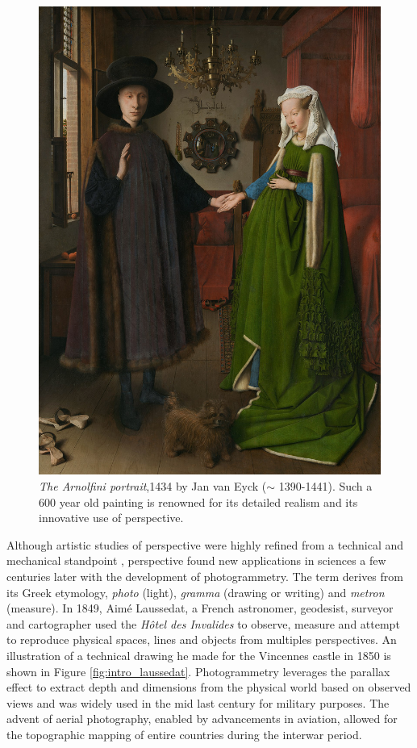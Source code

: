 \begin{figure}[htp!]
      \begin{center}
      \includegraphics[width=\textwidth]{images/introduction/The_Arnolfini_portrait.jpg}
      \end{center}
      \caption{\textit{The Arnolfini portrait},1434 by Jan van Eyck ($\sim$ 1390-1441). Such a 600 year old painting is renowned for its detailed realism and its innovative use of perspective.}
      \label{fig:arnolfini}
\end{figure}

Although artistic studies of perspective were highly refined from a technical and mechanical standpoint \citep{simon2021jan}, perspective found new applications in sciences a few centuries later with the development of photogrammetry. The term derives from its Greek etymology, \textit{photo} (\ie light), \textit{gramma} (\ie drawing or writing) and \textit{metron} (\ie measure). In 1849, Aimé Laussedat, a French astronomer, geodesist, surveyor and cartographer used the \textit{Hôtel des Invalides} to observe, measure and attempt to reproduce physical spaces, lines and objects from multiples perspectives. An illustration of a technical drawing he made for the Vincennes castle in 1850 is shown in Figure \ref{fig:intro_laussedat}. Photogrammetry leverages the parallax effect to extract depth and dimensions from the physical world based on observed views and was widely used in the mid last century for military purposes. The advent of aerial photography, enabled by advancements in aviation, allowed for the topographic mapping of entire countries during the interwar period.

